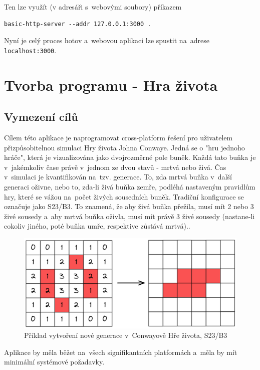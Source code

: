 \documentclass[a4paper, 12pt]{article} %
\begin{document}
		Ten lze využít (v adresáři s~webovými soubory) příkazem
		\begin{verbatim}
basic-http-server --addr 127.0.0.1:3000 .
		\end{verbatim}
		
		Nyní je celý proces hotov a~webovou aplikaci lze spustit na~adrese \linebreak\texttt{localhost:3000}.\cite{wasm_vid, wasm_gh}


\section{Tvorba programu - Hra života}
	\subsection{Vymezení cílů}
		Cílem této aplikace je naprogramovat cross-platform řešení pro uživatelem přizpůsobitelnou simulaci Hry života Johna Conwaye. Jedná se o "hru jednoho hráče", která je vizualizována jako dvojrozměrné pole buněk. Každá tato buňka je v~jakémkoliv čase právě v~jednom ze dvou stavů - mrtvá nebo živá. Čas v~simulaci je kvantifikován na~tzv. generace. To, zda mrtvá buňka v~další generaci oživne, nebo to, zda-li živá buňka zemře, podléhá nastaveným pravidlům hry, které se vážou na~počet živých sousedních buněk. Tradiční konfigurace se označuje jako S23/B3. To znamená, že aby živá buňka přežila, musí mít 2 nebo 3 živé sousedy a~aby mrtvá buňka oživla, musí mít právě 3 živé sousedy (nastane-li cokoliv jiného, poté buňka umře, respektive zůstává mrtvá).\cite{conway}.
		\begin{center}
			\begin{figure}[H]
				\centering
				\includegraphics[width=.82\linewidth]{conway}
				\caption{Příklad vytvoření nové generace v~Conwayově Hře života, S23/B3}
				\label{fig:conway}
			\end{figure}
		\end{center}
	
		Aplikace by měla běžet na~všech signifikantních platformách a~měla by mít minimální systémové požadavky.
	
\end{document}
